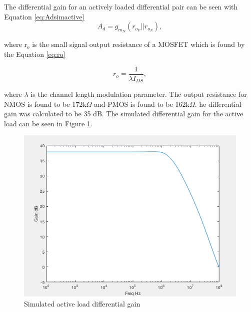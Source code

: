 The differential gain for an actively loaded differential pair can be seen with Equation \ref{eq:Adsimactive}
\begin{equation}
A_d = g_{m_N}(r_{o_P}||r_{o_N}),
\label{eqn:Ad_Active_Load}
\end{equation}

where  r$_o$ is the small signal output resistance of a MOSFET which is found by the Equation \ref{eq:ro}

\begin{equation}
r_o = \frac{1}{\lambda I_{DS}},
\label{eqn:ro}
\end{equation}

where  $\lambda$ is the channel length modulation parameter. The output resistance for NMOS is found to be 172k$\Omega$ and PMOS is found to be 162k$\Omega$. he differential gain was calculated to be 35 dB. The simulated differential gain for the active load can be seen in Figure \ref{fig:activeAdsim}.


\begin{figure}[H]
    \begin{center}
    \includegraphics[scale=.30]{Simulations/gainsecondstage.png}
    \caption{Simulated active load differential gain}
    \label{fig:activeAdsim}
    \end{center}
\end{figure}

